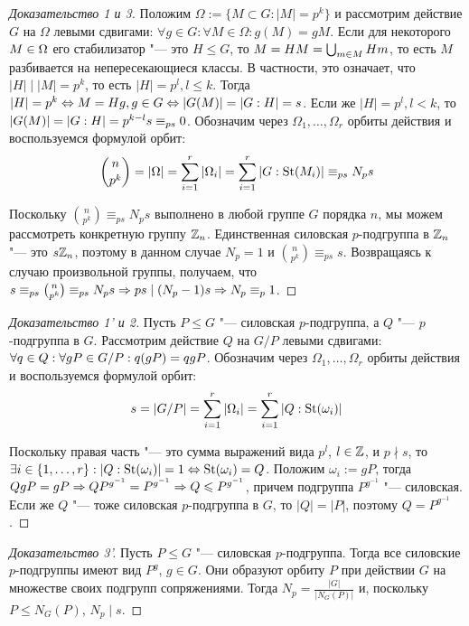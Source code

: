 \begin{proof}[Доказательство 1 и 3]
	Положим $\Omega := \{M  \subset G: |M| = p^k\}$ и рассмотрим действие $G$ на $\Omega$ левыми сдвигами: $\forall g \in G: \forall M \in \Omega: g(M) = gM$. Если для некоторого $M \hm\in \Omega$ его стабилизатор "--- это $H \le G$, то $M = HM \hm= \bigcup_{m \in M}Hm$, то есть $M$ разбивается на непересекающиеся классы. В частности, это означает, что $|H| \mid |M| = p^k$, то есть $|H| = p^l, l \le k$. Тогда $|H| = p^k \Lra M = Hg, g \in G \Lra |G(M)| \hm= |G : H| = s$. Если же $|H| = p^l, l < k$, то $|G(M)| = |G : H| \hm= p^{k-l}s \equiv_{ps} 0$. Обозначим через $\Omega_1, \dotsc, \Omega_r$ орбиты действия и воспользуемся формулой орбит:
	\[\binom{n}{p^k} = |\Omega| = \sum\limits_{i = 1}^r|\Omega_i| = \sum\limits_{i = 1}^r|G : \operatorname{St}(M_i)| \equiv_{ps} N_ps\]
	
	Поскольку $\binom{n}{p^k} \equiv_{ps} N_ps$ выполнено в любой группе $G$ порядка $n$, мы можем рассмотреть конкретную группу $\mathbb{Z}_n$. Единственная силовская $p$-подгруппа в $\mathbb{Z}_n$ "--- это $s\mathbb{Z}_n$, поэтому в данном случае $N_p = 1$ и $\binom{n}{p^k} \equiv_{ps} s$. Возвращаясь к случаю произвольной группы, получаем, что $s \equiv_{ps} \binom{n}{p^k} \equiv_{ps} N_ps \Rightarrow ps\mid(N_p - 1)s \Rightarrow N_p \equiv_p 1$.
\end{proof}

\begin{proof}[Доказательство 1' и 2]
	Пусть $P \le G$ "--- силовская $p$-подгруппа, а $Q$ "--- $p$-подгруппа в $G$. Рассмотрим действие $Q$ на $G / P$ левыми сдвигами: $\forall q \in Q: \forall gP \in G / P: q(gP) \hm= qgP$. Обозначим через $\Omega_1, \dotsc, \Omega_r$ орбиты действия и воспользуемся формулой орбит:
	\[s = |G / P| = \sum\limits_{i = 1}^r |\Omega_i| = \sum\limits_{i = 1}^r |Q : \operatorname{St}(\omega_i)|\]
	
	Поскольку правая часть "--- это сумма выражений вида $p^l$, $l \in \mathbb{Z}$, и $p \nmid s$, то $\exists i \hm\in \{1, \dotsc, r\}: |Q: \St(\omega_i)| = 1 \Lra \St(\omega_i) = Q$. Положим $\omega_i := gP$, тогда $QgP = gP \hm\ra QP^{g^{-1}} = P^{g^{-1}} \ra Q \le P^{g^{-1}}$, причем подгруппа $P^{g^{-1}}$ "--- силовская. Если же $Q$ "--- тоже силовская $p$-подгруппа в $G$, то $|Q| = |P|$, поэтому $Q = P^{g^{-1}}$.
\end{proof}

\begin{proof}[Доказательство 3']
	Пусть $P \le G$ "--- силовская $p$-подгруппа. Тогда все силовские $p$-подгруппы имеют вид $P^g$, $g \in G$. Они образуют орбиту $P$ при действии $G$ на множестве своих подгрупп сопряжениями. Тогда $N_p = \frac{|G|}{|N_G(P)|}$ и, поскольку $P \le N_G(P)$, $N_p \mid s$.
\end{proof}


